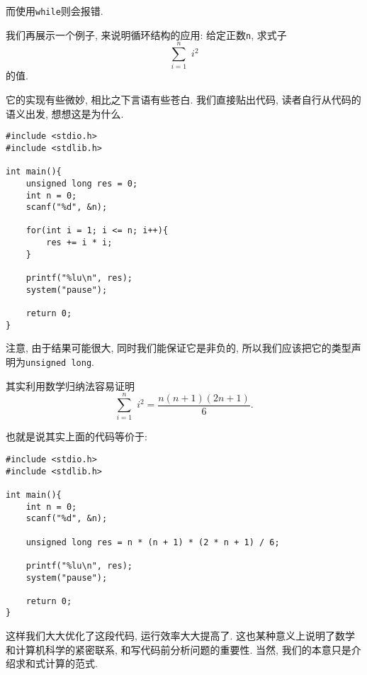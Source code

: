            而使用\texttt{while}则会报错.

            我们再展示一个例子, 来说明循环结构的应用: 给定正数\texttt{n}, 求式子
                \[ \sum^ n _ {i = 1} \, \, i ^ 2 \]
            的值.

            它的实现有些微妙, 相比之下言语有些苍白. 我们直接贴出代码, 读者自行从代码的语义出发, 想想这是为什么.
\begin{lstlisting}
#include <stdio.h>
#include <stdlib.h>

int main(){
    unsigned long res = 0;
    int n = 0;
    scanf("%d", &n);

    for(int i = 1; i <= n; i++){
        res += i * i;
    }

    printf("%lu\n", res);
    system("pause");

    return 0;
}
\end{lstlisting}

            \begin{sloppypar}
            注意, 由于结果可能很大, 同时我们能保证它是非负的, 所以我们应该把它的类型声明为\texttt{unsigned long}.
            \end{sloppypar}

            其实利用数学归纳法容易证明
                \[ \sum ^n _{i = 1} \,\, i ^ 2 = \dfrac{n(n + 1)(2n + 1)}{6} .\]

            也就是说其实上面的代码等价于:
\begin{lstlisting}
#include <stdio.h>
#include <stdlib.h>

int main(){
    int n = 0;
    scanf("%d", &n);

    unsigned long res = n * (n + 1) * (2 * n + 1) / 6;

    printf("%lu\n", res);
    system("pause");

    return 0;
}
\end{lstlisting}

            这样我们大大优化了这段代码, 运行效率大大提高了. 这也某种意义上说明了数学和计算机科学的紧密联系, 和写代码前分析问题的重要性. 当然, 我们的本意只是介绍求和式计算的范式.

